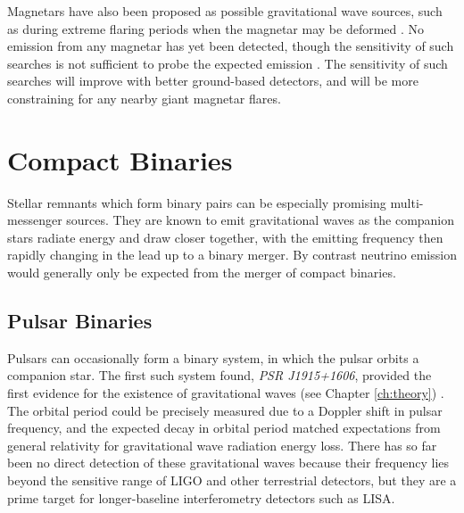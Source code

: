 Magnetars have also been proposed as possible gravitational wave sources, such as during extreme flaring periods when the magnetar may be deformed . No emission from any magnetar has yet been detected, though the sensitivity of such searches is not sufficient to probe the expected emission . The sensitivity of such searches will improve with better ground-based detectors, and will be more constraining for any nearby giant magnetar flares.


\section{Compact Binaries}
\label{sec:ns_mergers}

Stellar remnants which form binary pairs can be especially promising multi-messenger sources. They are known to emit gravitational waves as the companion stars radiate energy and draw closer together, with the emitting frequency then rapidly changing in the lead up to a binary merger. By contrast neutrino emission would generally only be expected from the merger of compact binaries.


\subsection*{Pulsar Binaries}

Pulsars can occasionally form a binary system, in which the pulsar orbits a companion star. The first such system found, \emph{PSR J1915+1606}, provided the first evidence for the existence of gravitational waves (see Chapter \ref{ch:theory}) . The orbital period could be precisely measured due to a Doppler shift in pulsar frequency, and the expected decay in orbital period matched expectations from general relativity for gravitational wave radiation energy loss. There has so far been no direct detection of these gravitational waves because their frequency lies beyond the sensitive range of LIGO and other terrestrial detectors, but they are a prime target for longer-baseline interferometry detectors such as LISA. 

